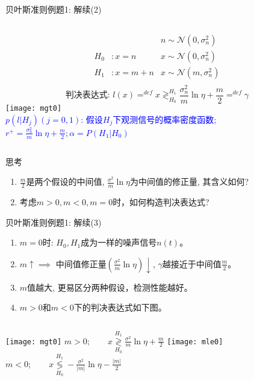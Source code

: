 \begin{frame}[shrink]{贝叶斯准则例题1: 解续(2)}
\begin{columns}
	\begin{align*}
	&&n\sim\mathcal{N}(0,\sigma_n^2)\\ 
	H_0 &:x=n   &x\sim\mathcal{N}(0,\sigma_n^2)\\
	H_1 &:x=m+n &x\sim\mathcal{N}(m,\sigma_n^2)\\
	\end{align*}
	\[\text{判决表达式:  } l(x)\mathop{=}^{def}x\mathop{\gtrless}_{H_0}^{H_1}\frac{\sigma_n^2}{m}\ln\eta+\frac{m}{2}\mathop{=}^{def}\gamma \]
	\texttt{[image: mgt0]}\\
	\scriptsize
	\textcolor{blue}{$p(l|H_j)(j=0,1)$: 假设$H_j$下观测信号的概率密度函数; $r^+=\frac{\sigma_n^2}{m}\ln\eta+\frac{m}{2}; \alpha=P(H_1|H_0)$}
\end{columns}
\begin{block}{思考}
	\begin{enumerate}
		\item $\frac{m}{2}$是两个假设的中间值, $\frac{\sigma^2}{m}\ln\eta$为中间值的修正量, 其含义如何?
		\item 考虑$m>0,m<0,m=0$时，如何构造判决表达式?
	\end{enumerate} 
\end{block}
\end{frame}

\begin{frame}[shrink]{贝叶斯准则例题1: 解续(3)}
\begin{enumerate}
	\item $m=0$时: $H_0,H_1$成为一样的噪声信号$n(t)$。
	\item $m\uparrow\implies$ 中间值修正量$(\frac{\sigma^2}{m}\ln\eta)\downarrow$, $\gamma$越接近于中间值$\frac{m}{2}$。
	\item $m$值越大, 更易区分两种假设，检测性能越好。
	\item $m>0$和$m<0$下的判决表达式如下图。
\end{enumerate}	
\begin{columns}
	\texttt{[image: mgt0]}
	$m>0;\qquad x\mathop{\gtrless}\limits_{H_0}^{H_1}\frac{\sigma^2}{m}\ln\eta+\frac{m}{2}$
	\texttt{[image: mle0]}
	$m<0;\qquad x\mathop{\lessgtr}\limits_{H_0}^{H_1}-\frac{\sigma^2}{|m|}\ln\eta-\frac{|m|}{2}$
\end{columns}
\end{frame}

